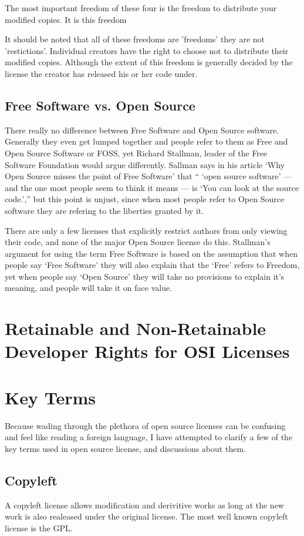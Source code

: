 \documentclass[12pt,letterpaper]{article}
\begin{document}
The most important freedom of these four is the freedom to distribute
your modified copies. It is this freedom

It should be noted that all of these freedoms are 'freedoms' they are
not 'restictions'. Individual creators have the right to choose not to
distribute their modified copies. Although the extent of this freedom is
generally decided by the license the creator has released his or her
code under.

\subsection*{Free Software vs. Open Source}
There really no difference between Free Software and Open Source software.
Generally they even get lumped together and people refer to them as Free and
Open Source Software or FOSS, yet Richard Stallman, leader of the Free Software
Foundation would argue differently. Sallman says in his article `Why Open
Source misses the point of Free Software' that `` `open source software' — and the
one most people seem to think it means — is `You can look at the source
code.','' but this point is unjust, since when most people refer to Open Source
software they are refering to the liberties granted by it. 

There are only a few licenses that explicitly restrict authors from only
viewing their code, and none of the major Open Source license do this.
Stallman's argument for using the term Free Software is based on the assumption
that when people say `Free Software' they will also explain that the `Free'
refers to Freedom, yet when people say `Open Source' they will take no
provisions to explain it's meaning, and people will take it on face value.  
\cite{website:gnu-open-source}


\section*{Retainable and Non-Retainable Developer Rights for OSI Licenses}


\section*{Key Terms}
Because wading through the plethora of open source licenses can be
confusing and feel like reading a foreign language, I have attempted to
clarify a few of the key terms used in open source license, and
discussions about them.

\subsection*{Copyleft}
A copyleft license allows modification and derivitive
works as long at the new work is also realeased under the original
license. The most well known copyleft license is the GPL. 
\end{document}
